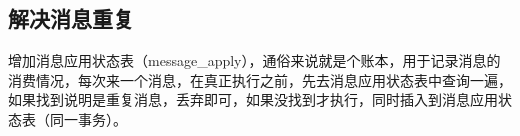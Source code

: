 \documentclass[../../../interview-questions.tex]{subfiles}
\begin{document}
\subsection{解决消息重复}

增加消息应用状态表（message\_apply），通俗来说就是个账本，用于记录消息的消费情况，每次来一个消息，在真正执行之前，先去消息应用状态表中查询一遍，如果找到说明是重复消息，丢弃即可，如果没找到才执行，同时插入到消息应用状态表（同一事务）。
\end{document}

